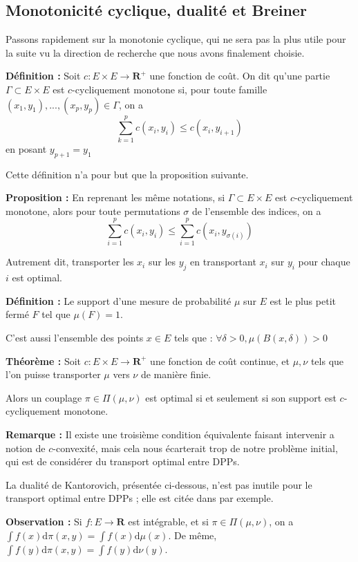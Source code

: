 \documentclass[12pt]{article}
\let\oldsum\sum
\renewcommand{\sum}{\oldsum\limits}
\begin{document}
\subsection{Monotonicité cyclique, dualité et Breiner}

Passons rapidement sur la monotonie cyclique, qui ne sera pas la plus utile pour la suite vu la direction de recherche que nous avons finalement choisie.

\textbf{Définition :} Soit $c : E \times E \to \mathbf R^+ $ une fonction de coût. On dit qu'une partie $ \Gamma \subset E \times E $ est $c$-cycliquement monotone si, pour toute famille $(x_1,y_1),...,(x_p,y_p) \in \Gamma $, on a $$ \sum_{k=1}^p c(x_i,y_i) \leqslant c(x_i,y_{i+1}) $$ en posant $y_{p+1} = y_1 $

Cette définition n'a pour but que la proposition suivante.

\textbf{Proposition :} En reprenant les même notations, si $ \Gamma \subset E \times E$ est $c$-cycliquement monotone, alors pour toute permutations $ \sigma $ de l'ensemble des indices, on a $$ \sum_{i=1}^p c(x_i, y_i) \leqslant \sum_{i=1}^p c(x_i, y_{\sigma(i)}) $$ 

Autrement dit, transporter les $ x_i$ sur les $y_j$ en transportant $ x_i$ sur $y_i$ pour chaque $i$ est optimal.

\textbf{Définition :} Le support d'une mesure de probabilité $ \mu $ sur $E$ est le plus petit fermé $F$ tel que $ \mu(F) = 1$. 

C'est aussi l'ensemble des points $ x \in E $ tels que : $ \forall \delta > 0, \mu(B(x, \delta)) > 0 $

\textbf{Théorème :} Soit $c : E \times E \to \mathbf R^+ $ une fonction de coût continue, et $\mu, \nu $ tels que l'on puisse transporter $ \mu $ vers $ \nu $ de manière finie.

Alors un couplage $ \pi \in \Pi(\mu, \nu) $ est optimal si et seulement si son support est $c$-cycliquement monotone.

\textbf{Remarque :} Il existe une troisième condition équivalente faisant intervenir a notion de $c$-convexité, mais cela nous écarterait trop de notre problème initial, qui est de considérer du transport optimal entre DPPs.

La dualité de Kantorovich, présentée ci-dessous, n'est pas inutile pour le transport optimal entre DPPs ; elle est citée dans \cite{DecreusefondMoroz2021} par exemple.

\textbf{Observation :} Si $ f : E \to \mathbf R $ est intégrable, et si $ \pi \in \Pi(\mu, \nu) $, on a $ \displaystyle \int f(x) \mathrm d \pi (x,y) = \int f(x) \mathrm d \mu (x) $. De même, $ \displaystyle \int f(y) \mathrm d \pi (x,y) = \int f(y) \mathrm d \nu (y) $.
\end{document}
